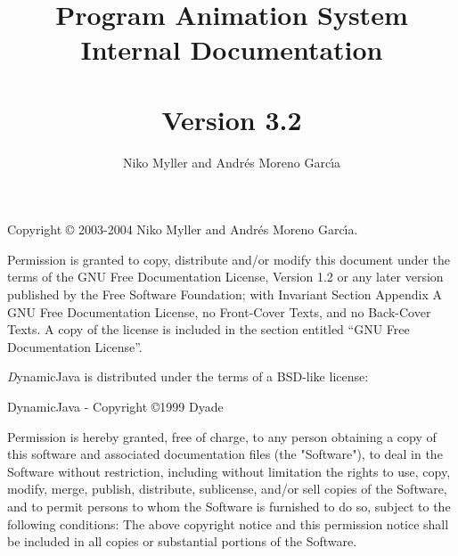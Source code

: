 \documentclass[a4paper, 12pt]{article}
\title{\jel{} Program Animation System\\Internal Documentation\\\mbox{}\\\large{Version 3.2}}
\author{Niko Myller and Andr\'{e}s Moreno Garc\'{\i}a}
\newcommand{\jel}{Jeliot}
\newcommand{\djava}{DynamicJava}
\begin{document}

\maketitle
\thispagestyle{empty}

%
%
%
%
%
%
%
%
%
%

\newpage

\thispagestyle{empty} %
\vfil
Copyright \copyright{} 2003-2004  Niko Myller and Andr\'{e}s Moreno Garc\'{\i}a.
\bigskip

{\small Permission is granted to copy, distribute and/or modify this document
under the terms of the GNU Free Documentation License, Version 1.2
or any later version published by the Free Software Foundation;
with Invariant Section Appendix A GNU Free Documentation License,
no Front-Cover Texts, and no Back-Cover Texts.
A copy of the license is included in the section entitled ``GNU Free Documentation License''. }

{\emph \djava{}} is distributed under the terms of a BSD-like license:

\djava{} - Copyright \copyright 1999 Dyade

{\small Permission is hereby granted, free of charge, to any person
obtaining a copy of this software and associated documentation
files (the "Software"), to deal in the Software without restriction,
including without limitation the rights to use, copy, modify, merge,
publish, distribute, sublicense, and/or sell copies of the Software,
and to permit persons to whom the Software is furnished to do so,
subject to the following conditions: The above copyright notice and
this permission notice shall be included in all copies or substantial
portions of the Software. }
\end{document}
